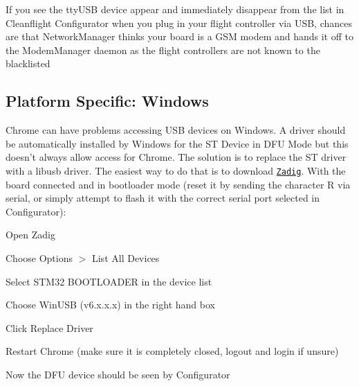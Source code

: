 If you see the tty\+U\+S\+B device appear and immediately disappear from the list in Cleanflight Configurator when you plug in your flight controller via U\+S\+B, chances are that Network\+Manager thinks your board is a G\+S\+M modem and hands it off to the Modem\+Manager daemon as the flight controllers are not known to the blacklisted

\subsection*{Platform Specific\+: Windows}

Chrome can have problems accessing U\+S\+B devices on Windows. A driver should be automatically installed by Windows for the S\+T Device in D\+F\+U Mode but this doesn't always allow access for Chrome. The solution is to replace the S\+T driver with a libusb driver. The easiest way to do that is to download \href{http://zadig.akeo.ie/}{\tt Zadig}. With the board connected and in bootloader mode (reset it by sending the character R via serial, or simply attempt to flash it with the correct serial port selected in Configurator)\+:
\begin{DoxyItemize}
\item Open Zadig
\item Choose Options $>$ List All Devices
\item Select {\ttfamily S\+T\+M32 B\+O\+O\+T\+L\+O\+A\+D\+E\+R} in the device list
\item Choose {\ttfamily Win\+U\+S\+B (v6.\+x.\+x.\+x)} in the right hand box 
\item Click Replace Driver
\item Restart Chrome (make sure it is completely closed, logout and login if unsure)
\item Now the D\+F\+U device should be seen by Configurator 
\end{DoxyItemize}